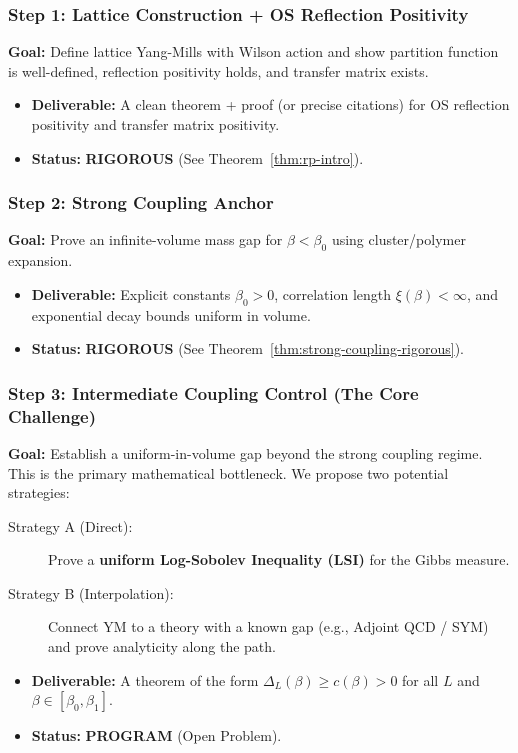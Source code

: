\subsubsection*{Step 1: Lattice Construction + OS Reflection Positivity}
\textbf{Goal:} Define lattice Yang-Mills with Wilson action and show partition function is well-defined, reflection positivity holds, and transfer matrix exists.
\begin{itemize}
    \item \textbf{Deliverable:} A clean theorem + proof (or precise citations) for OS reflection positivity and transfer matrix positivity.
    \item \textbf{Status:} \textbf{RIGOROUS} (See Theorem~\ref{thm:rp-intro}).
\end{itemize}

\subsubsection*{Step 2: Strong Coupling Anchor}
\textbf{Goal:} Prove an infinite-volume mass gap for $\beta < \beta_0$ using cluster/polymer expansion.
\begin{itemize}
    \item \textbf{Deliverable:} Explicit constants $\beta_0 > 0$, correlation length $\xi(\beta) < \infty$, and exponential decay bounds uniform in volume.
    \item \textbf{Status:} \textbf{RIGOROUS} (See Theorem~\ref{thm:strong-coupling-rigorous}).
\end{itemize}

\subsubsection*{Step 3: Intermediate Coupling Control (The Core Challenge)}
\textbf{Goal:} Establish a uniform-in-volume gap beyond the strong coupling regime. This is the primary mathematical bottleneck.
We propose two potential strategies:
\begin{description}
    \item[Strategy A (Direct):] Prove a \textbf{uniform Log-Sobolev Inequality (LSI)} for the Gibbs measure.
    \item[Strategy B (Interpolation):] Connect YM to a theory with a known gap (e.g., Adjoint QCD / SYM) and prove analyticity along the path.
\end{description}
\begin{itemize}
    \item \textbf{Deliverable:} A theorem of the form $\Delta_L(\beta) \ge c(\beta) > 0$ for all $L$ and $\beta \in [\beta_0, \beta_1]$.
    \item \textbf{Status:} \textbf{PROGRAM} (Open Problem).
\end{itemize}


